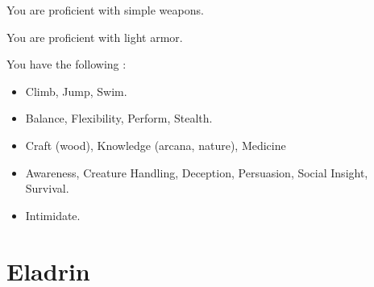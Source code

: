       You are proficient with simple weapons.

      You are proficient with light armor.

      You have the following :
      \begin{itemize}
        \item {} Climb, Jump, Swim.
        \item {} Balance, Flexibility, Perform, Stealth.
        \item {} Craft (wood), Knowledge (arcana, nature), Medicine
        \item {} Awareness, Creature Handling, Deception, Persuasion, Social Insight, Survival.
        \item {} Intimidate.
      \end{itemize}

\section{Eladrin}

